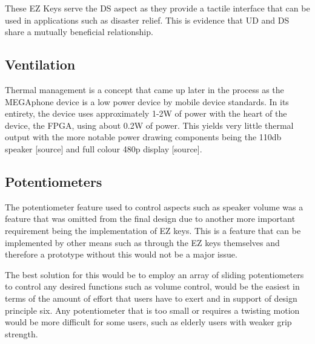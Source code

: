 These EZ Keys serve the DS aspect as they provide a tactile interface that can be used in applications such as disaster relief.
This is evidence that UD and DS share a mutually beneficial relationship.

\subsection{Ventilation} %

Thermal management is a concept that came up later in the process as the MEGAphone device is a low power device by mobile device standards.
In its entirety, the device uses approximately 1-2W of power with the heart of the device, the FPGA, using about 0.2W of power.
This yields very little thermal output with the more notable power drawing components being the 110db speaker [source] and full colour 480p display [source].

\subsection{Potentiometers}

The potentiometer feature used to control aspects such as speaker volume was a feature that was omitted from the final design due to another more important requirement being the implementation of EZ keys.
This is a feature that can be implemented by other means such as through the EZ keys themselves and therefore a prototype without this would not be a major issue.

The best solution for this would be to employ an array of sliding potentiometers to control any desired functions such as volume control, would be the easiest in terms of the amount of effort that users have to exert and in support of design principle six.
Any potentiometer that is too small or requires a twisting motion would be more difficult for some users, such as elderly users with weaker grip strength.

